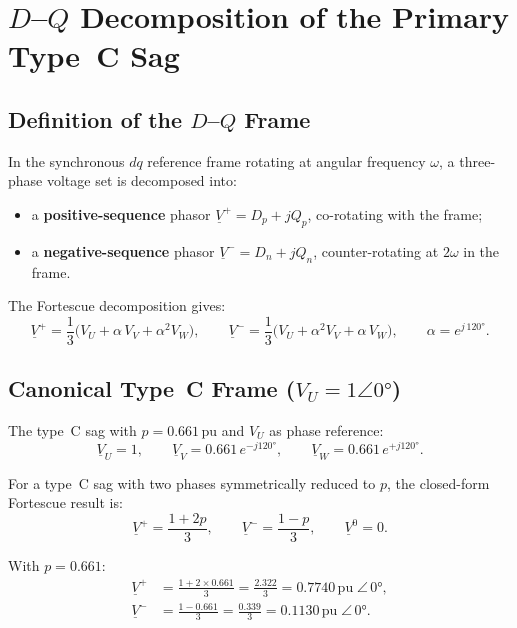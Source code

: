 \documentclass[a4paper,11pt]{article}
\begin{document}
\section{$D$--$Q$ Decomposition of the Primary Type~C Sag}
\label{sec:dq}

\subsection{Definition of the $D$--$Q$ Frame}

In the synchronous $dq$ reference frame rotating at angular frequency
$\omega$, a three-phase voltage set is decomposed into:
\begin{itemize}
  \item a \textbf{positive-sequence} phasor $\underline{V}^+= D_p + jQ_p$,
        co-rotating with the frame;
  \item a \textbf{negative-sequence} phasor $\underline{V}^-= D_n + jQ_n$,
        counter-rotating at $2\omega$ in the frame.
\end{itemize}
The Fortescue decomposition gives:
\begin{equation}
\underline{V}^+ = \frac{1}{3}\bigl(V_U + \alpha\,V_V + \alpha^2 V_W\bigr),
\qquad
\underline{V}^- = \frac{1}{3}\bigl(V_U + \alpha^2 V_V + \alpha\,V_W\bigr),
\qquad \alpha = e^{j\,120°}.
\end{equation}

\subsection{Canonical Type~C Frame ($V_U = 1\angle 0°$)}

The type~C sag with $p = 0.661\,\mathrm{pu}$ and $V_U$ as phase reference:
\begin{equation}
\underline{V}_U = 1,\qquad
\underline{V}_V = 0.661\,e^{-j120°},\qquad
\underline{V}_W = 0.661\,e^{+j120°}.
\end{equation}

For a type~C sag with two phases symmetrically reduced to $p$, the
closed-form Fortescue result is:
\begin{equation}
\underline{V}^+ = \frac{1+2p}{3},\qquad
\underline{V}^- = \frac{1-p}{3},\qquad
\underline{V}^0 = 0.
\label{eq:typeC_symcomp}
\end{equation}

With $p = 0.661$:
\begin{align}
\underline{V}^+ &= \frac{1+2\times0.661}{3} = \frac{2.322}{3}
  = 0.7740\,\mathrm{pu}\;\angle\,0°, \\[4pt]
\underline{V}^- &= \frac{1-0.661}{3} = \frac{0.339}{3}
  = 0.1130\,\mathrm{pu}\;\angle\,0°.
\end{align}
\end{document}
